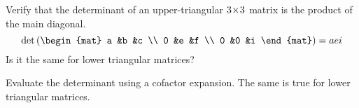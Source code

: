 
\begin{Exercise}[
name={},
title={}, 
difficulty=0,
origin={\cite{JH}}]
    Verify that the determinant of an upper-triangular
    $3 \! \times \! 3$ matrix is the product of the main diagonal. 
    \begin{equation*}
       \det\left(
       \begin{mat}
           a    &b   &c    \\
           0    &e   &f    \\
           0    &0   &i
       \end{mat}
       \right)
       =aei
    \end{equation*}
    Is it the same for lower triangular matrices?
\end{Exercise}

\begin{Answer}
Evaluate the determinant using a cofactor expansion.  The same is true for lower triangular matrices.
\end{Answer}
